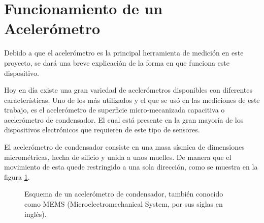 \section{Funcionamiento de un Acelerómetro}

Debido a que el acelerómetro es la principal herramienta de medición en este proyecto, se dará una breve explicación de la forma en que funciona este dispositivo.

Hoy en día existe una gran variedad de acelerómetros disponibles con diferentes características.
Uno de los más utilizados y el que se usó en las mediciones de este trabajo, es el acelerómetro de superficie micro-mecanizada capacitiva o acelerómetro de condensador. 
El cual está presente en la gran mayoría de los dispositivos electrónicos que requieren de este tipo de sensores.

El acelerómetro de condensador consiste en una masa sísmica de dimensiones micrométricas, hecha de silicio y unida a unos muelles. 
De manera que el movimiento de esta quede restringido a una sola dirección, como se muestra en la figura \ref{figura1}.\\


\begin{figure}[H]
\centering
{}
\caption{Esquema de un acelerómetro de condensador, también conocido como MEMS (Microelectromechanical System, por sus siglas en inglés).}
\label{figura1}
\end{figure}

